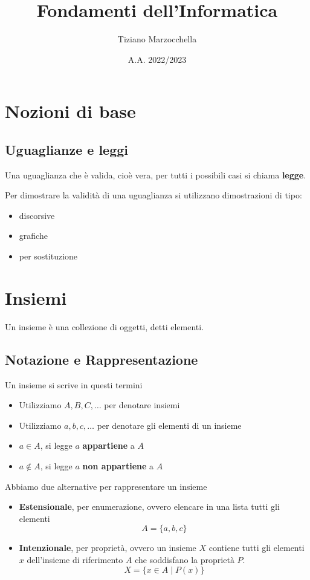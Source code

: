 \documentclass{article}
\title{Fondamenti dell'Informatica}
\author{Tiziano Marzocchella}
\date{A.A. 2022/2023}
\begin{document}


\section{Nozioni di base}
\subsection{Uguaglianze e leggi}
Una uguaglianza che è valida, cioè vera, per tutti i possibili casi si chiama \textbf{legge}.

Per dimostrare la validità di una uguaglianza si utilizzano dimostrazioni di tipo:
\begin{itemize}
    \item discorsive
    \item grafiche
    \item per sostituzione
\end{itemize}
\pagebreak

\section{Insiemi}
Un insieme è una collezione di oggetti, detti elementi.

\subsection{Notazione e Rappresentazione}
Un insieme si scrive in questi termini
\begin{itemize}
    \item Utilizziamo \(A, B, C, \dots\) per denotare insiemi
    \item Utilizziamo \(a, b, c, \dots\) per denotare gli elementi di un insieme
    \item \(a \in A\), si legge \(a\) \textbf{appartiene} a \(A\)
    \item \(a \not\in A\), si legge \(a\) \textbf{non appartiene} a \(A\)
\end{itemize}

\noindent Abbiamo due alternative per rappresentare un insieme
\begin{itemize}
    \item \textbf{Estensionale}, per enumerazione, ovvero elencare in una lista tutti gli elementi
          \[A = \{a,b,c\}\]
    \item \textbf{Intenzionale}, per proprietà, ovvero un insieme \(X\) contiene tutti gli elementi \(x\) dell'insieme di riferimento \(A\) che soddisfano la proprietà \(P\).
          \[X = \{ x \in A \mid P(x) \}\]
\end{itemize}
\end{document}
